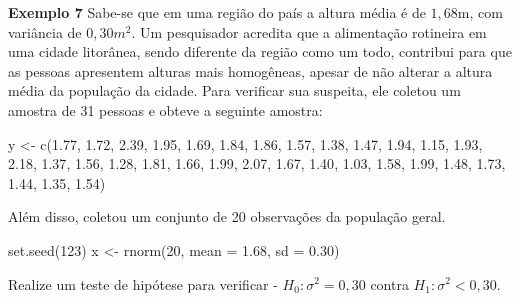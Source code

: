 \documentclass[
  10pt,
  a4paper]{book}
\newenvironment{Shaded}{\begin{snugshade}}{\end{snugshade}}
\newcommand{\AttributeTok}[1]{\textcolor[rgb]{0.77,0.63,0.00}{#1}}
\newcommand{\DecValTok}[1]{\textcolor[rgb]{0.00,0.00,0.81}{#1}}
\newcommand{\FloatTok}[1]{\textcolor[rgb]{0.00,0.00,0.81}{#1}}
\newcommand{\FunctionTok}[1]{\textcolor[rgb]{0.00,0.00,0.00}{#1}}
\newcommand{\NormalTok}[1]{#1}
\newcommand{\OtherTok}[1]{\textcolor[rgb]{0.56,0.35,0.01}{#1}}
\begin{document}
\textbf{Exemplo 7} Sabe-se que em uma região do país a altura média é de \(1,68\)m, com variância de \(0,30m^2\). Um pesquisador acredita que a alimentação rotineira em uma cidade litorânea, sendo diferente da região como um todo, contribui para que as pessoas apresentem alturas mais homogêneas, apesar de não alterar a altura média da população da cidade. Para verificar sua suspeita, ele coletou um amostra de 31 pessoas e obteve
a seguinte amostra:

\begin{Shaded}
\begin{Highlighting}[]
\NormalTok{y }\OtherTok{\textless{}{-}} \FunctionTok{c}\NormalTok{(}\FloatTok{1.77}\NormalTok{, }\FloatTok{1.72}\NormalTok{, }\FloatTok{2.39}\NormalTok{, }\FloatTok{1.95}\NormalTok{, }\FloatTok{1.69}\NormalTok{, }\FloatTok{1.84}\NormalTok{, }\FloatTok{1.86}\NormalTok{, }\FloatTok{1.57}\NormalTok{, }\FloatTok{1.38}\NormalTok{, }\FloatTok{1.47}\NormalTok{, }\FloatTok{1.94}\NormalTok{, }
       \FloatTok{1.15}\NormalTok{, }\FloatTok{1.93}\NormalTok{, }\FloatTok{2.18}\NormalTok{, }\FloatTok{1.37}\NormalTok{, }\FloatTok{1.56}\NormalTok{, }\FloatTok{1.28}\NormalTok{, }\FloatTok{1.81}\NormalTok{, }\FloatTok{1.66}\NormalTok{, }\FloatTok{1.99}\NormalTok{, }\FloatTok{2.07}\NormalTok{, }\FloatTok{1.67}\NormalTok{, }
       \FloatTok{1.40}\NormalTok{, }\FloatTok{1.03}\NormalTok{, }\FloatTok{1.58}\NormalTok{, }\FloatTok{1.99}\NormalTok{, }\FloatTok{1.48}\NormalTok{, }\FloatTok{1.73}\NormalTok{, }\FloatTok{1.44}\NormalTok{, }\FloatTok{1.35}\NormalTok{, }\FloatTok{1.54}\NormalTok{)}
\end{Highlighting}
\end{Shaded}

Além disso, coletou um conjunto de 20 observações da população geral.

\begin{Shaded}
\begin{Highlighting}[]
\FunctionTok{set.seed}\NormalTok{(}\DecValTok{123}\NormalTok{)}
\NormalTok{x }\OtherTok{\textless{}{-}} \FunctionTok{rnorm}\NormalTok{(}\DecValTok{20}\NormalTok{, }\AttributeTok{mean =} \FloatTok{1.68}\NormalTok{, }\AttributeTok{sd =} \FloatTok{0.30}\NormalTok{)}
\end{Highlighting}
\end{Shaded}

Realize um teste de hipótese para verificar
- \(H_0: \sigma^2 = 0,30\) contra \(H_1: \sigma^2 < 0,30\).
\end{document}
